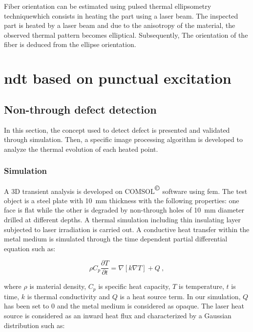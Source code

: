 \documentclass[12pt]{spieman}
\begin{document}
\begin{spacing}{2}
Fiber orientation can be estimated using pulsed thermal ellipsometry technique\cite{Cielo1987}which consists in heating the part using a laser beam. The inspected part is heated by a laser beam and due to the anisotropy of the material, the observed thermal pattern becomes elliptical. Subsequently, The orientation of the fiber is deduced from the ellipse orientation.


% 

\section{\acl{ndt} based on punctual excitation}\label{sec:3}

\subsection{Non-through defect detection}\label{subsec:31}

In this section, the concept used to detect defect is presented and validated through simulation. Then, a specific image processing algorithm is developed to analyze the thermal evolution of each heated point. 

\subsubsection{Simulation}\label{subsec:311}

A 3D transient analysis is developed on COMSOL\textsuperscript{$\copyright$} software using \ac{fem}. The test object is a steel plate with \SI{10}{\milli \metre} thickness with the following properties: one face is flat while the other is degraded by non-through holes of \SI{10}{\milli \metre} diameter drilled at different depths. A thermal simulation including thin insulating layer subjected to laser irradiation is carried out. 
A conductive heat transfer within the metal medium is simulated through the time dependent partial differential equation such as:

\begin{equation}
  \label{eq:1}
  \rho C_p \frac{\partial T}{\partial t} = \nabla \left[ k \nabla T  \right] + Q \ ,
\end{equation}

\noindent where $\rho$ is material density, $C_p$ is specific heat capacity, $T$ is temperature, $t$ is time, $k$ is thermal conductivity and $Q$ is a heat source term.
In our simulation, $Q$ has been set to $0$ and the metal medium is considered as opaque. The laser heat source is considered as an inward heat flux and characterized by a Gaussian distribution such as:


\end{spacing}
\end{document}

